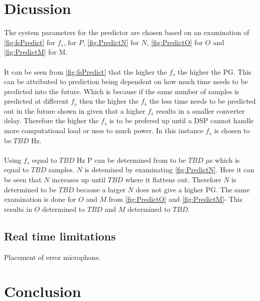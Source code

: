 \section{Dicussion}
The system parameters for the predictor are chosen based on an examination of \autoref{fig:fsPredict} for $f_s$,  for $P$, \autoref{fig:PredictN} for $N$, \autoref{fig:PredictO} for $O$ and \autoref{fig:PredictM} for M.
\\\\
It can be seen from \autoref{fig:fsPredict} that the higher the $f_s$ the higher the PG. This can be attributed to prediction being dependent on how much time needs to be predicted into the future. Which is because if the same number of samples is predicted at different $f_s$ then the higher the $f_s$ the less time needs to be predicted out in the future shown in  given that a higher $f_s$ results in a smaller converter delay. Therefore the higher the $f_s$ is to be prefered up until a DSP cannot handle more computational load or uses to much power. In this instance $f_s$ is chosen to be $TBD$ Hz. 
\\\\
Using $f_s$ equal to $TBD$ Hz P can be determined from  to be $TBD$ $\mu$s which is equal to $TBD$ samples. $N$ is detemined by examinating \autoref{fig:PredictN}. Here it can be seen that $N$ increases up until $TBD$ where it flattens out. Therefore $N$ is determined to be $TBD$ because a larger $N$ does not give a higher PG. The same examination is done for $O$ and $M$ from \autoref{fig:PredictO} and \autoref{fig:PredictM}- This results in $O$ determined to $TBD$ and $M$ determined to $TBD$.   






\subsection*{Real time limitations}
Placement of error microphone.


\section{Conclusion}
